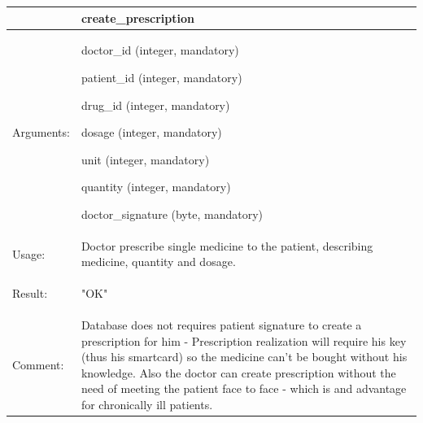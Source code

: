 
    \begin{longtable}{| p{3cm} | p{10.75cm} |}
    \hline
     & create\_prescription \\ \hline
    Arguments: &  \begin{packed_enum}
    	\item doctor\_id (integer, mandatory)
		\item patient\_id (integer, mandatory)
		\item drug\_id (integer, mandatory)
		\item dosage (integer, mandatory)
		\item unit (integer, mandatory)
		\item quantity (integer, mandatory)
		\item doctor\_signature (byte, mandatory)
	\end{packed_enum}     \\ \hline
    Usage: & Doctor prescribe single medicine to the patient, describing medicine, quantity and dosage. \\ \hline
    Result: & \begin{packed_enum}
    	\item "OK"
	\end{packed_enum}     \\ \hline	
		Comment: & Database does not requires patient signature to create a prescription for him - Prescription realization will require his key (thus his smartcard) so the medicine can't be bought without his knowledge. Also the doctor can create prescription without the need of meeting the patient face to face - which is and advantage for chronically ill patients.\\ \hline
    \end{longtable}



